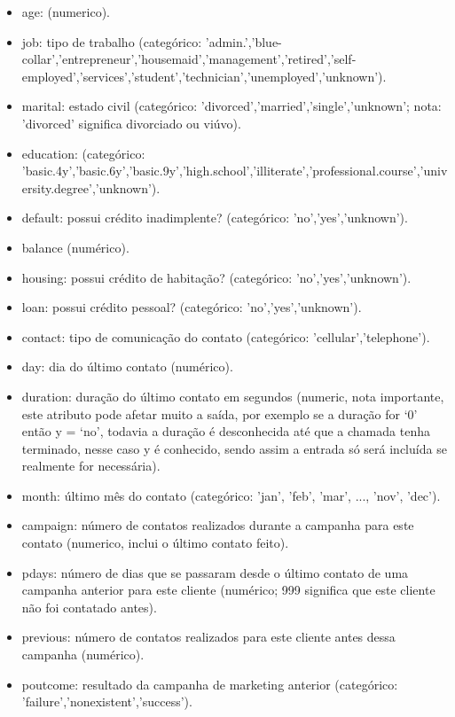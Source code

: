 \documentclass[conference]{IEEEtran}
\begin{document}
\begin{itemize}
    \item age: (numerico).

    \item job: tipo de trabalho (categórico: 'admin.','blue-collar','entrepreneur','housemaid','management','retired','self-employed','services','student','technician','unemployed','unknown').

    \item marital: estado civil (categórico: 'divorced','married','single','unknown'; nota: 'divorced' significa divorciado ou viúvo).

    \item education: (categórico: 'basic.4y','basic.6y','basic.9y','high.school','illiterate','professional.course','university.degree','unknown').

    \item default: possui crédito inadimplente? (categórico: 'no','yes','unknown').

    \item balance (numérico).

    \item housing: possui crédito de habitação? (categórico: 'no','yes','unknown').

    \item loan: possui crédito pessoal? (categórico: 'no','yes','unknown').

    \item contact: tipo de comunicação do contato (categórico: 'cellular','telephone').

    \item day: dia do último contato  (numérico).

    \item duration: duração do último contato em segundos (numeric, nota importante, este atributo pode afetar muito a saída, por exemplo se a duração for ‘0’ então y = ‘no’, todavia a duração é desconhecida até que a chamada tenha terminado, nesse caso y é conhecido, sendo assim a entrada só será  incluída se realmente for necessária).

    \item month: último mês do contato (categórico: 'jan', 'feb', 'mar', ..., 'nov', 'dec').

    \item campaign: número de contatos realizados durante a campanha para este contato (numerico, inclui o último contato feito).
    
    \item pdays: número de dias que se passaram desde o último contato de uma campanha anterior para este cliente (numérico; 999 significa que este cliente não foi contatado antes).

    \item previous: número de contatos realizados para este cliente antes dessa campanha (numérico).

    \item poutcome: resultado da campanha de marketing anterior (categórico: 'failure','nonexistent','success').
\end{itemize}
\end{document}
